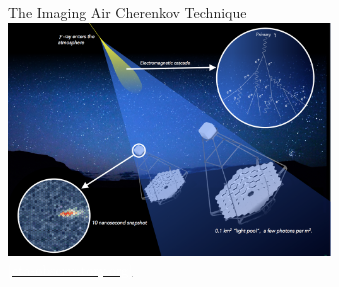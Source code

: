 \begin{frame}{The Imaging Air Cherenkov Technique}
    \centering
    \includegraphics[width=0.64\textwidth]{images/Cherenkov-Effect.png}\\[-1.1\baselineskip]
    \small\href{https://www.cta-observatory.org/astri-detects-crab-at-tev-energies/}{\textcolor{white}{[cta-observatory.org]}}

\end{frame}

